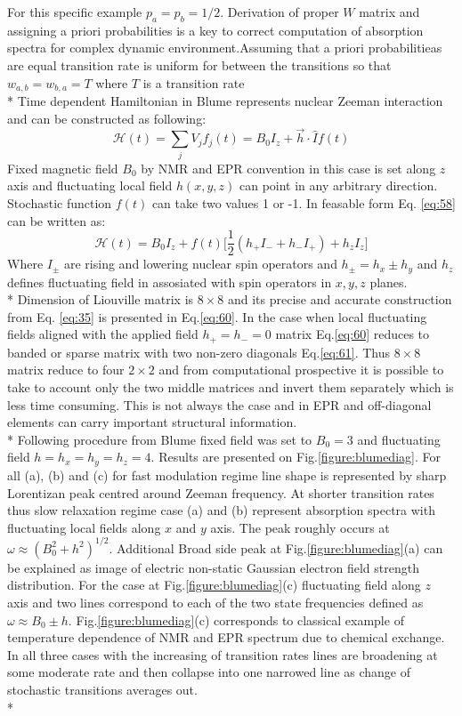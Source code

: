 For this specific example $p_a=p_b=1/2$. Derivation of proper $W$ matrix and assigning a priori probabilities is a key to correct computation of absorption spectra for complex dynamic environment.Assuming that a priori probabilitieas are equal transition rate is uniform for between the transitions so that $w_{a,b}=w_{b,a}=T$ where $T$ is a transition rate \\*
Time dependent Hamiltonian in Blume\cite{blume} represents nuclear Zeeman interaction and can be constructed as following: 
\begin{equation}\label{eq:58}
\mathcal{H}(t)=\sum_jV_jf_j(t)=B_0I_z+\vec{h}\cdot\hat{I}f(t)
\end{equation}  
Fixed magnetic field $B_0$ by NMR and EPR convention in this case is set along $z$ axis and fluctuating local field $h(x,y,z)$ can point in any arbitrary direction. Stochastic function $f(t)$ can take two values 1 or -1. In feasable form Eq. \ref{eq:58} can be written as: 
\begin{equation}\label{eq:blumeham}
\mathcal{H}(t)=B_0I_z+f(t)\big[\frac{1}{2}(h_+I_-+h_-I_+)+h_zI_z\big]
\end{equation}     
Where $I_{\pm}$ are rising and lowering nuclear spin operators and $h_{\pm}=h_x\pm h_y$ and $h_z$ defines fluctuating field in assosiated with spin operators in $x,y,z$ planes. \\*
Dimension of Liouville matrix is $8\times 8$ and its precise and accurate construction from Eq. \ref{eq:35} is presented in Eq.\ref{eq:60}. In the case when local fluctuating fields aligned with the applied field $h_+=h_-=0$ matrix Eq.\ref{eq:60} reduces to banded or sparse matrix with two non-zero diagonals Eq.\ref{eq:61}. Thus $8\times 8$ matrix reduce to four $2\times 2$ and from computational prospective it is possible to take to account only the two middle matrices and invert them separately which is less time consuming. This is not always the case and in EPR and off-diagonal elements can carry important structural information. \\*
Following procedure from Blume \cite{blume} fixed field was set to $B_0=3$ and fluctuating field $h=h_x=h_y=h_z=4$. Results are presented on Fig.\ref{figure:blumediag}. For all (a), (b) and (c) for fast modulation regime line shape is represented by sharp Lorentizan peak centred around Zeeman frequency. At shorter transition rates thus slow relaxation regime case (a) and (b) represent absorption spectra with fluctuating local fields along $x$ and $y$ axis. The peak roughly occurs at $\omega\approx(B_0^2+h^2)^{1/2}$. Additional Broad side peak at  Fig.\ref{figure:blumediag}(a) can be explained as image of electric non-static Gaussian electron field strength distribution. For the case at Fig.\ref{figure:blumediag}(c) fluctuating field along $z$ axis and two lines correspond to each of the two state frequencies defined as $\omega\approx B_0\pm h$. Fig.\ref{figure:blumediag}(c) corresponds to classical example of temperature dependence of NMR and EPR spectrum due to chemical exchange. In all three cases with the increasing of transition rates lines are broadening at some moderate rate and then collapse into one narrowed line as change of stochastic transitions averages out. \\*
